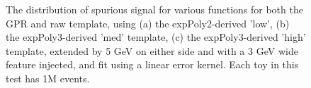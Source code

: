 \begin{figure} 
\begin{center}

\caption{The distribution of spurious signal for various functions for both the GPR and raw template, using (a) the expPoly2-derived 'low', (b) the expPoly3-derived 'med' template, (c) the expPoly3-derived 'high' template, extended by 5 GeV on either side and with a 3 GeV wide feature injected, and fit using a linear error kernel. Each toy in this test has 1M events.}
\label{fig:linearkernel_lowpt_1M_Sig}
\end{center}
\end{figure}

